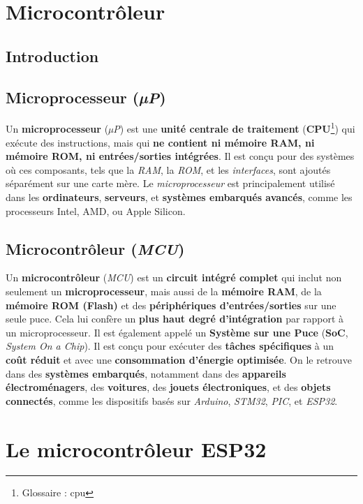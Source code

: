 \section{Microcontrôleur}

\subsection{Introduction}

\subsection{Microprocesseur (\textit{µP})}
Un \textbf{microprocesseur} (\textit{µP}) est une 
\textbf{unité centrale de traitement} (\textbf{CPU}\footnote{Glossaire : \gls{cpu}}) qui exécute des 
instructions, mais qui \textbf{ne contient ni mémoire RAM, ni mémoire ROM, ni 
entrées/sorties intégrées}. Il est conçu pour des systèmes où ces composants, 
tels que la \textit{RAM}, la \textit{ROM}, et les \textit{interfaces}, sont 
ajoutés séparément sur une carte mère. Le \textit{microprocesseur} est 
principalement utilisé dans les \textbf{ordinateurs}, \textbf{serveurs}, et 
\textbf{systèmes embarqués avancés}, comme les processeurs Intel, AMD, ou Apple 
Silicon.\par

\subsection{Microcontrôleur (\textit{MCU})}
Un \textbf{microcontrôleur} (\textit{MCU}) est un \textbf{circuit intégré complet} 
qui inclut non seulement un \textbf{microprocesseur}, mais aussi de la 
\textbf{mémoire RAM}, de la \textbf{mémoire ROM (Flash)} et des 
\textbf{périphériques d'entrées/sorties} sur une seule puce. Cela lui confère un 
\textbf{plus haut degré d'intégration} par rapport à un microprocesseur. Il est 
également appelé un \textbf{Système sur une Puce} (\textbf{SoC}, 
\textit{System On a Chip}). Il est conçu pour exécuter des 
\textbf{tâches spécifiques} à un \textbf{coût réduit} et avec une 
\textbf{consommation d'énergie optimisée}. On le retrouve dans des 
\textbf{systèmes embarqués}, notamment dans des 
\textbf{appareils électroménagers}, des \textbf{voitures}, des 
\textbf{jouets électroniques}, et des \textbf{objets connectés}, comme les 
dispositifs basés sur \textit{Arduino}, \textit{STM32}, \textit{PIC}, et 
\textit{ESP32}.\par

\section{Le microcontrôleur ESP32}

